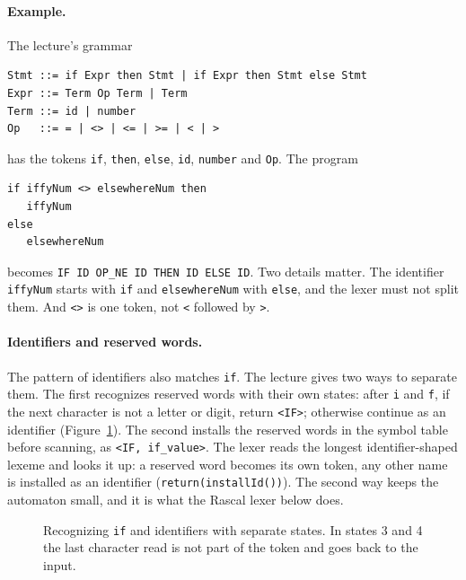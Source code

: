 \paragraph{Example.} The lecture's grammar
\begin{lstlisting}
Stmt ::= if Expr then Stmt | if Expr then Stmt else Stmt
Expr ::= Term Op Term | Term
Term ::= id | number
Op   ::= = | <> | <= | >= | < | >
\end{lstlisting}
has the tokens \texttt{if}, \texttt{then}, \texttt{else}, \texttt{id},
\texttt{number} and \texttt{Op}. The program
\begin{lstlisting}
if iffyNum <> elsewhereNum then
   iffyNum
else
   elsewhereNum
\end{lstlisting}
becomes \texttt{IF ID OP\_NE ID THEN ID ELSE ID}. Two details matter. The
identifier \texttt{iffyNum} starts with \texttt{if} and \texttt{elsewhereNum} with
\texttt{else}, and the lexer must not split them. And \texttt{<>} is one token,
not \texttt{<} followed by \texttt{>}.

\paragraph{Identifiers and reserved words.} The pattern of identifiers also
matches \texttt{if}. The lecture gives two ways to separate them. The first
recognizes reserved words with their own states: after \texttt{i} and
\texttt{f}, if the next character is not a letter or digit, return
\texttt{<IF>}; otherwise continue as an identifier
(Figure~\ref{fig:if-dfa}). The second installs the reserved words in the
symbol table before scanning, as \texttt{<IF, if\_value>}. The lexer reads the
longest identifier-shaped lexeme and looks it up: a reserved word becomes its
own token, any other name is installed as an identifier
(\texttt{return(installId())}). The second way keeps the automaton small, and
it is what the Rascal lexer below does.

\begin{figure}[h]
\centering
{}
\caption{Recognizing \texttt{if} and identifiers with separate states. In states 3 and 4 the last character read is not part of the token and goes back to the input.}
\label{fig:if-dfa}
\end{figure}


